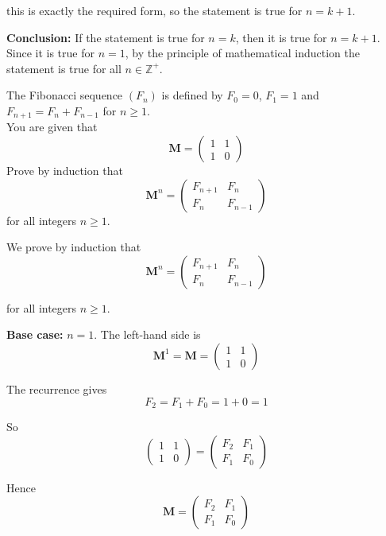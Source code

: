 \documentclass[leqno]{article}
\begin{document}
\begin{enumerate}[
  label=\textbf{\arabic*.},
  leftmargin=*,
  topsep=0pt,
  partopsep=0pt,
  parsep=0pt
]
\begin{djsSolution}
this is exactly the required form, so the statement is true for \(n=k+1\).

\textbf{Conclusion:} If the statement is true for \(n=k\), then it is true for \(n=k+1\). Since it is true for \(n=1\), by the principle of mathematical induction the statement is true for all \(n\in\mathbb{Z}^+\).
\end{djsSolution}


\newpage

\questionitem

The Fibonacci sequence $(F_n)$ is defined by $F_0=0$, $F_1=1$ and $F_{n+1}=F_n+F_{n-1}$ for $n\geq 1$. \\
You are given that
\[
\mathbf{M} = \begin{pmatrix} 1 & 1 \\ 1 & 0 \end{pmatrix}
\]
Prove by induction that
\[
\mathbf{M}^n = \begin{pmatrix} F_{n+1} & F_n \\ F_n & F_{n-1} \end{pmatrix}
\]
for all integers $n \geq 1$.  \\

\vspace*{10pt}

\begin{djsSolution}
We prove by induction that
\[
\mathbf{M}^n=\begin{pmatrix}F_{n+1}&F_n\\[2pt]F_n&F_{n-1}\end{pmatrix}
\]

for all integers \(n\geq 1\).

\textbf{Base case:} \(n=1\). The left-hand side is
\[
\mathbf{M}^1=\mathbf{M}=\begin{pmatrix}1&1\\1&0\end{pmatrix}
\]

The recurrence gives
\[
F_2=F_1+F_0=1+0=1
\]

So
\[
\begin{pmatrix}1&1\\1&0\end{pmatrix}
=
\begin{pmatrix}F_2&F_1\\F_1&F_0\end{pmatrix}
\]

Hence
\[
\mathbf{M}=\begin{pmatrix}F_2&F_1\\F_1&F_0\end{pmatrix}
\]


\end{djsSolution}
\end{enumerate}
\end{document}
